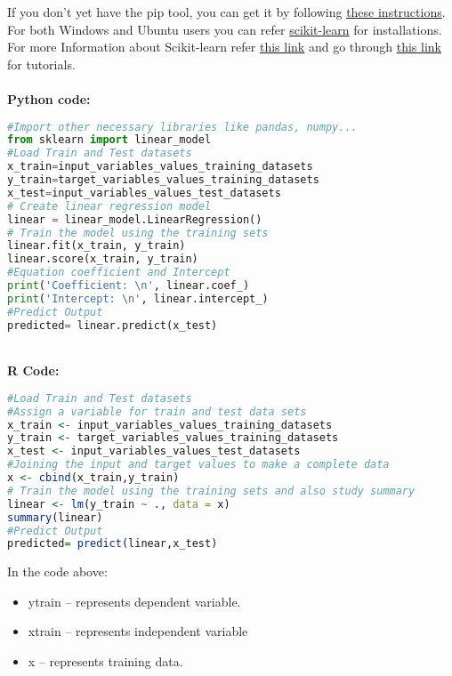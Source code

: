 \documentclass[Proceedings]{ascelike}
\begin{document}
If you don't yet have the pip tool, you can get it by following \href{https://pip.pypa.io/en/latest/installing/}{these instructions}.
\\For both Windows and Ubuntu users you can refer \href{http://scikit-learn.org/stable/developers/advanced_installation.html#advanced-installation}{scikit-learn} for installations.\\
For more Information about Scikit-learn refer \href{http://scikit-learn.org/stable/}{this link} and go through \href{http://scikit-learn.org/stable/tutorial/index.html}{this link} for tutorials.\\
\\\textbf{Python code:}
\begin{lstlisting}[language=Python]
#Import other necessary libraries like pandas, numpy...
from sklearn import linear_model
#Load Train and Test datasets
x_train=input_variables_values_training_datasets
y_train=target_variables_values_training_datasets
x_test=input_variables_values_test_datasets
# Create linear regression model
linear = linear_model.LinearRegression()
# Train the model using the training sets 
linear.fit(x_train, y_train)
linear.score(x_train, y_train)
#Equation coefficient and Intercept
print('Coefficient: \n', linear.coef_)
print('Intercept: \n', linear.intercept_)
#Predict Output
predicted= linear.predict(x_test)
\end{lstlisting}\\
\textbf{R Code:}
\begin{lstlisting}[language=R]
#Load Train and Test datasets
#Assign a variable for train and test data sets
x_train <- input_variables_values_training_datasets
y_train <- target_variables_values_training_datasets
x_test <- input_variables_values_test_datasets
#Joining the input and target values to make a complete data
x <- cbind(x_train,y_train)
# Train the model using the training sets and also study summary
linear <- lm(y_train ~ ., data = x)
summary(linear)
#Predict Output
predicted= predict(linear,x_test) 
\end{lstlisting}
In the code above:
\begin{itemize}
	\item y\textunderscore train – represents dependent variable.
	\item x\textunderscore train – represents independent variable
	\item x – represents training data.
\end{itemize}
\end{document}
